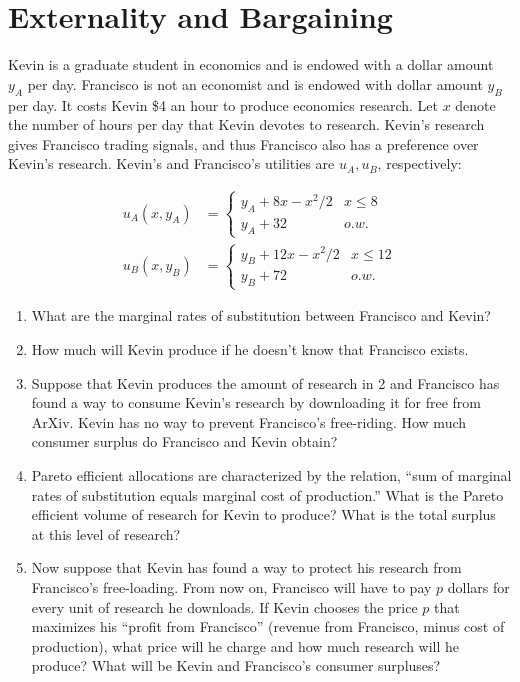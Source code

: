 \documentclass[11pt]{article}
\begin{document}
\section{Externality and Bargaining}

Kevin is a graduate student in economics and is endowed with a dollar amount
$y_A$ per day.  Francisco is not an economist and is endowed with dollar amount
$y_B$ per day. It costs Kevin \$4 an hour to produce economics research. Let $x$
denote the number of hours per day that Kevin devotes to research. Kevin's
research gives Francisco trading signals, and thus Francisco also has a
preference over Kevin's research. Kevin's and Francisco's utilities are $u_A,
u_B$, respectively:

\begin{align*}
  u_A(x, y_A) &= \begin{cases}
  y_A + 8x - x^2/2 & x \le 8 \\
  y_A + 32 & o.w.
\end{cases} \\
  u_B(x, y_B) &= \begin{cases}
  y_B + 12x - x^2/2 & x \le 12 \\
  y_B + 72 & o.w.
\end{cases}
\end{align*}
    
\begin{enumerate}

\item What are the marginal rates of substitution between Francisco and Kevin?

\item How much will Kevin produce if he doesn't know that Francisco exists.

\item Suppose that Kevin produces the amount of research in 2 and Francisco has
found a way to consume Kevin's research by downloading it for free from ArXiv.
Kevin has no way to prevent Francisco's free-riding. How much consumer surplus
do Francisco and Kevin obtain?

\item Pareto efficient allocations are characterized by the relation, ``sum of
marginal rates of substitution equals marginal cost of production.'' What is the
Pareto efficient volume of research for Kevin to produce? What is the total
surplus at this level of research?

\item Now suppose that Kevin has found a way to protect his research from
Francisco's free-loading. From now on, Francisco will have to pay $p$ dollars
for every unit of research he downloads. If Kevin chooses the price $p$ that
maximizes his ``profit from Francisco'' (revenue from Francisco, minus cost of
production), what price will he charge and how much research will he produce?
What will be Kevin and Francisco's consumer surpluses?


\end{enumerate}
\end{document}
